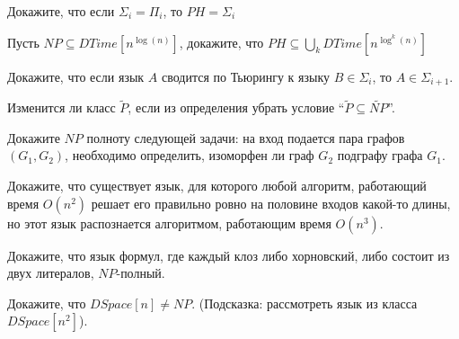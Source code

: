 \setcounter{curtask}{40}


\begin{task}
    Докажите, что если $\Sigma_i = \Pi_i$, то $PH = \Sigma_i$
\end{task}

\begin{task}
    Пусть $NP \subseteq DTime[n^{\log(n)}]$, докажите, что $PH \subseteq \bigcup\limits_{k} DTime[n^{\log^k(n)}]$
\end{task}

\begin{task}
    Докажите, что если язык $A$ сводится по Тьюрингу к языку $B \in \Sigma_{i}$, то
    $A \in \Sigma_{i + 1}$.
\end{task}

\breakline

\begin{ptask}{30}
    Изменится ли класс $\widetilde{P}$, если из определения убрать условие
    ``$\widetilde{P} \subseteq \widetilde{NP}$''.
\end{ptask}

\begin{ptask}{31}
    Докажите $NP$ полноту следующей задачи:
    на вход подается пара графов $(G_1, G_2)$, необходимо определить, изоморфен ли
    граф $G_2$ подграфу графа $G_1$.
\end{ptask}

\begin{ptask}{36}
    Докажите, что существует язык, для которого любой алгоритм, работающий время
    $O(n^2)$ решает его правильно ровно на половине входов какой-то длины, но
    этот язык распознается алгоритмом, работающим время $O(n^3)$.
\end{ptask}

\begin{ptask}{37}
	Докажите, что язык формул, где каждый клоз либо хорновский, либо состоит из двух
    литералов, $NP$-полный.
\end{ptask}

\begin{ptask}{38}
    Докажите, что $DSpace[n] \ne NP$.
    (Подсказка: рассмотреть язык из класса $DSpace[n^2]$).
\end{ptask}